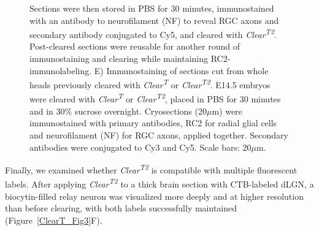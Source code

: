 \begin{figure}[hbtp]
\begin{center}
{		Sections were then stored in PBS for 30 minutes, immunostained with an antibody to neurofilament (NF) to reveal RGC axons and secondary antibody conjugated to Cy5, and cleared with \emph{Clear\textsuperscript{T2}}.
		Post-cleared sections were reusable for another round of immunostaining and clearing while maintaining RC2-immunolabeling.
		E) Immunostaining of sections cut from whole heads previously cleared with \emph{Clear\textsuperscript{T}} or \emph{Clear\textsuperscript{T2}}.
		E14.5 embryos were cleared with \emph{Clear\textsuperscript{T}} or \emph{Clear\textsuperscript{T2}}, placed in PBS for 30 minutes and in 30\% sucrose overnight.
		Cryosections (20$\mu$m) were immunostained with primary antibodies, RC2 for radial glial cells and neurofilament (NF) for RGC axons, applied together.
		Secondary antibodies were conjugated to Cy3 and Cy5.
		Scale bars: 20$\mu$m.
		}
        \label{ClearT_SFig5}
    \end{center}
\end{figure}

Finally, we examined whether \emph{Clear\textsuperscript{T2}} is compatible with multiple fluorescent labels.
After applying \emph{Clear\textsuperscript{T2}} to a thick brain section with CTB-labeled dLGN, a biocytin-filled relay neuron was visualized more deeply and at higher resolution than before clearing, with both labels successfully maintained (Figure~\ref{ClearT_Fig3}F).